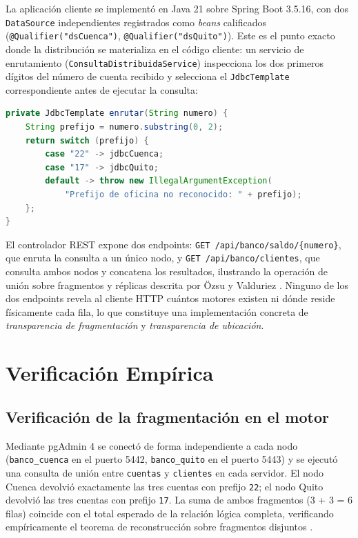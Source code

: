 \documentclass[conference]{IEEEtran}
\begin{document}
La aplicaci\'on cliente se implement\'o en Java 21 sobre Spring Boot 3.5.16,
con dos \texttt{DataSource} independientes registrados como \emph{beans}
calificados (\texttt{@Qualifier("dsCuenca")}, \texttt{@Qualifier("dsQuito")}).
Este es el punto exacto donde la distribuci\'on se materializa en el c\'odigo
cliente: un servicio de enrutamiento (\texttt{ConsultaDistribuidaService})
inspecciona los dos primeros d\'igitos del n\'umero de cuenta recibido y
selecciona el \texttt{JdbcTemplate} correspondiente antes de ejecutar la
consulta:

\begin{lstlisting}[language=Java]
private JdbcTemplate enrutar(String numero) {
    String prefijo = numero.substring(0, 2);
    return switch (prefijo) {
        case "22" -> jdbcCuenca;
        case "17" -> jdbcQuito;
        default -> throw new IllegalArgumentException(
            "Prefijo de oficina no reconocido: " + prefijo);
    };
}
\end{lstlisting}

El controlador REST expone dos endpoints: \texttt{GET /api/banco/saldo/\{numero\}},
que enruta la consulta a un \'unico nodo, y \texttt{GET /api/banco/clientes},
que consulta ambos nodos y concatena los resultados, ilustrando la operaci\'on
de uni\'on sobre fragmentos y r\'eplicas descrita por \"Ozsu y Valduriez
\cite{ozsu2020}. Ninguno de los dos endpoints revela al cliente HTTP cu\'antos
motores existen ni d\'onde reside f\'isicamente cada fila, lo que constituye
una implementaci\'on concreta de \emph{transparencia de fragmentaci\'on} y
\emph{transparencia de ubicaci\'on}.

\section{Verificaci\'on Emp\'irica}

\subsection{Verificaci\'on de la fragmentaci\'on en el motor}

Mediante pgAdmin 4 se conect\'o de forma independiente a cada nodo
(\texttt{banco\_cuenca} en el puerto 5442, \texttt{banco\_quito} en el
puerto 5443) y se ejecut\'o una consulta de uni\'on entre \texttt{cuentas} y
\texttt{clientes} en cada servidor. El nodo Cuenca devolvi\'o exactamente las
tres cuentas con prefijo \texttt{22}; el nodo Quito devolvi\'o las tres cuentas
con prefijo \texttt{17}. La suma de ambos fragmentos (3 + 3 = 6 filas) coincide
con el total esperado de la relaci\'on l\'ogica completa, verificando
emp\'iricamente el teorema de reconstrucci\'on sobre fragmentos disjuntos
\cite{ozsu2020}.
\end{document}
